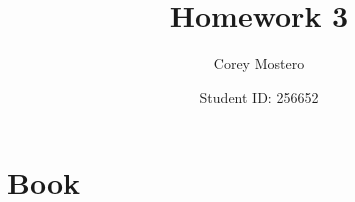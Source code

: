 \documentclass{article}
\title{Homework 3}
\author{Corey Mostero}
\date{Student ID: 256652}
\begin{document}
\newcommand{\hr}{\par\noindent\rule{\textwidth}{0.4pt}}

\newcommand{\bc}[1]{
	\begin{equation*}
		\begin{boxed}
			{#1}
		\end{boxed}
	\end{equation*}
}

\newcommand{\cond}[2]{
	\ifmmode
		{#1} \quad {#2}
	\else
		$$ {#1} \quad {#2} $$
	\fi
}

\maketitle
\newpage

\tableofcontents

\section{Book}
\end{document}
